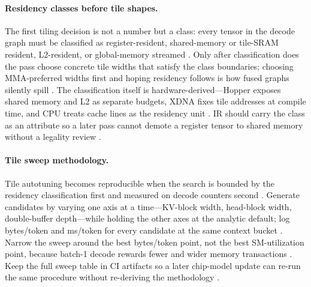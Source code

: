 \paragraph{Residency classes before tile shapes.}
The first tiling decision is not a number but a class: every tensor in the decode graph must be classified as register-resident, shared-memory or tile-SRAM resident, L2-resident, or global-memory streamed \citep{semianalysis2024tma,nvidia2022hopper,memoryfloor2026}. Only after classification does the pass choose concrete tile widths that satisfy the class boundaries; choosing MMA-preferred widths first and hoping residency follows is how fused graphs silently spill \citep{dao2022flashattention,yirage2026}. The classification itself is hardware-derived---Hopper exposes shared memory and L2 as separate budgets, XDNA fixes tile addresses at compile time, and CPU treats cache lines as the residency unit \citep{amd2024xdna,amd2024aie,dlbook}. IR should carry the class as an attribute so a later pass cannot demote a register tensor to shared memory without a legality review \citep{chen2020compilerbasedhardw,patel2025llminference}.

\paragraph{Tile sweep methodology.}
Tile autotuning becomes reproducible when the search is bounded by the residency classification first and measured on decode counters second \citep{patel2025llminference,taxbreak2026,memoryfloor2026}. Generate candidates by varying one axis at a time---KV-block width, head-block width, double-buffer depth---while holding the other axes at the analytic default; log bytes/token and ms/token for every candidate at the same context bucket \citep{dao2023flashdecoding,semianalysis2024tma}. Narrow the sweep around the best bytes/token point, not the best SM-utilization point, because batch-1 decode rewards fewer and wider memory transactions \citep{memoryfloor2026,taxbreak2026}. Keep the full sweep table in CI artifacts so a later chip-model update can re-run the same procedure without re-deriving the methodology \citep{yirage2026,chen2020compilerbasedhardw}.

